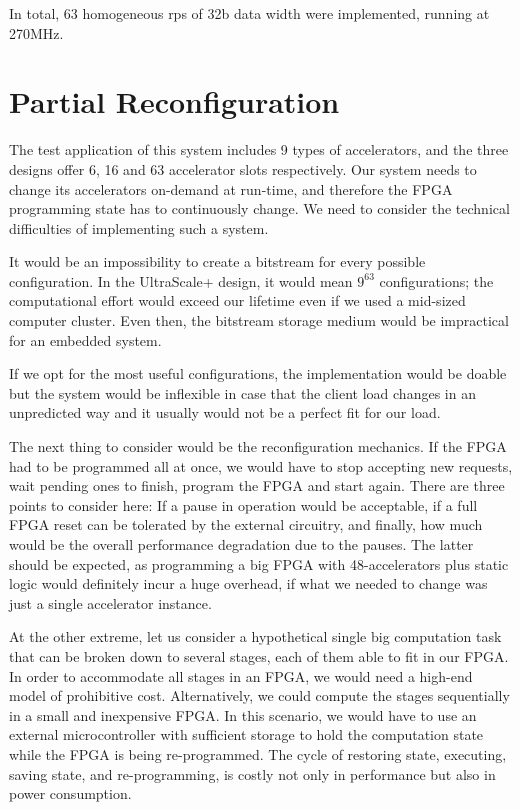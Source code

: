 In total, 63 homogeneous \glspl{rp} of 32b data width were implemented, running at 270MHz.

\section{Partial Reconfiguration}

The test application of this system includes 9 types of accelerators, and the three designs offer
6, 16 and 63 accelerator slots respectively.
Our system needs to change its accelerators on-demand at run-time,
and therefore the FPGA programming state has to continuously change.
We need to consider the technical difficulties of implementing such a system.

It would be an impossibility to create a bitstream for every possible configuration. In the UltraScale+ design,
it would mean $9^{63}$ configurations; the computational effort would exceed our lifetime even if we used
a mid-sized computer cluster. Even then, the bitstream storage medium would be impractical for an embedded system.

If we opt for the most useful configurations, the implementation would be doable but the system would
be inflexible in case that the client load changes in an unpredicted way and it usually would not be a perfect fit
for our load.

The next thing to consider would be the reconfiguration mechanics.
If the FPGA had to be programmed all at once, we would have to
stop accepting new requests, wait pending ones to finish, program the FPGA and start again.
There are three points to consider here: If a pause in operation would be acceptable, if a full FPGA reset
can be tolerated by the external circuitry,
and finally, how much would be the overall performance degradation due to the pauses.
The latter should be expected, as programming a big FPGA with 48-accelerators plus static logic
would definitely incur a huge overhead, if what we needed to change was just a single accelerator instance.

At the other extreme, let us consider a hypothetical single big computation task
that can be broken down to several stages, each of them able to fit in our FPGA.
In order to accommodate all stages in an FPGA, we would need a high-end model of prohibitive cost.
Alternatively, we could compute the stages sequentially in a small and inexpensive FPGA.
In this scenario, we would have to use an external microcontroller with sufficient storage
to hold the computation state while the FPGA is being re-programmed.
The cycle of restoring state, executing, saving state, and re-programming,
is costly not only in performance but also in power consumption.

